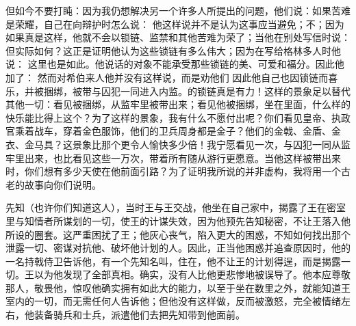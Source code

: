 但如今不要打盹：因为我仍想解决另一个许多人所提出的问题，他们说：如果苦难是荣耀，自己在向辩护时怎么说： 他这样说并不是认为这事应当避免；不；因为如果真是这样，他就不会以锁链、监禁和其他苦难为荣了；当他在别处写信时说： 但实际如何？这正是证明他认为这些锁链有多么伟大；因为在写给格林多人时他说： 这里也是如此。他说话的对象不能承受那些锁链的美、可爱和福分。因此他加了： 然而对希伯来人他并没有这样说，而是劝他们 因此他自己也因锁链而喜乐，并被捆绑，被带与囚犯一同进入内监。的锁链真是有力！这样的景象足以替代其他一切：看见被捆绑，从监牢里被带出来；看见他被捆绑，坐在里面，什么样的快乐能比得上这个？为了这样的景象，我有什么不愿付出呢？你们看见皇帝、执政官乘着战车，穿着金色服饰，他们的卫兵周身都是金子？他们的金戟、金盾、金衣、金马具？这景象比那个更令人愉快多少倍！我宁愿看见一次，与囚犯一同从监牢里出来，也比看见这些一万次，带着所有随从游行更愿意。当他这样被带出来时，你们想有多少天使在他前面引路？为了证明我所说的并非虚构，我将用一个古老的故事向你们说明。\par

先知（也许你们知道这人），当时王与王交战，他坐在自己家中，揭露了王在密室里与知情者所谋划的一切，使王的计谋失效，因为他预先告知秘密，不让王落入他所设的圈套。这严重困扰了王；他灰心丧气，陷入更大的困惑，不知如何找出那个泄露一切、密谋对抗他、破坏他计划的人。因此，正当他困惑并追查原因时，他的一名持戟侍卫告诉他，有一个先知名叫，住在，他不让王的计划得逞，而是揭露一切。王以为他发现了全部真相。确实，没有人比他更悲惨地被误导了。他本应尊敬那人，敬畏他，惊叹他确实拥有如此大的能力，以至于坐在数里之外，就能知道王室内的一切，而无需任何人告诉他；但他没有这样做，反而被激怒，完全被情绪左右，他装备骑兵和士兵，派遣他们去把先知带到他面前。\par

